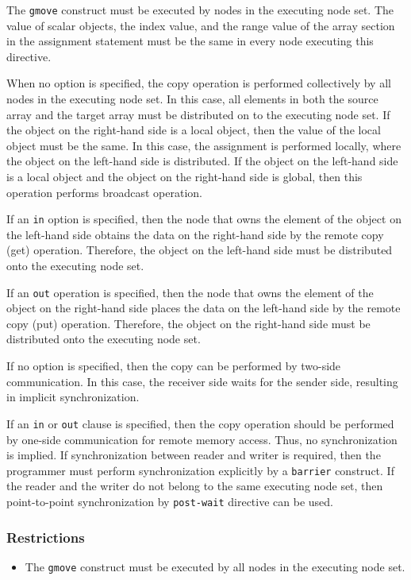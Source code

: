 The {\tt gmove} construct must be executed by nodes in the executing
node set. The value of scalar objects, the index value, and the range
value of the array section in the assignment statement must be the same in
every node executing this directive.

When no option is specified, the copy operation is performed
collectively by all nodes in the executing node set. In this case, all
elements in both the source array and the target array must be distributed on
to the executing node set. If the object on the right-hand side is a local
object, then the value of the local object must be the same. In this case, the
assignment is performed locally, where the object on the left-hand side is 
distributed. If the object on the left-hand side is a local object
and the object on the right-hand side is global, then this operation
performs broadcast operation.

If an {\tt in} option is specified, then the node that owns the element of
the object on the left-hand side obtains the data on the right-hand side by the 
remote copy (get) operation. Therefore, the object on the left-hand side
must be distributed onto the executing node set. 

If an {\tt out} operation is specified, then the node that owns the element
of the object on the right-hand side places the data on the left-hand side by the
remote copy (put) operation. Therefore, the object on the right-hand side
must be distributed onto the executing node set.

If no option is specified, then the copy can be performed by two-side
communication. In this case, the receiver side waits for the sender side,
resulting in implicit synchronization. 

If an {\tt in} or {\tt out} clause is specified, then the
copy operation should be performed by one-side communication for remote
memory access. Thus, no synchronization is implied. If
synchronization between reader and writer is required, then the programmer
must perform synchronization explicitly by a {\tt barrier} construct. If the reader
and the writer do not belong to the same executing node set, then
point-to-point synchronization by {\tt post-wait} directive can be used.

\subsubsection*{Restrictions}

\begin{itemize}
\item The {\tt gmove} construct must be executed by all nodes in the
  executing node set.
\end{itemize}


